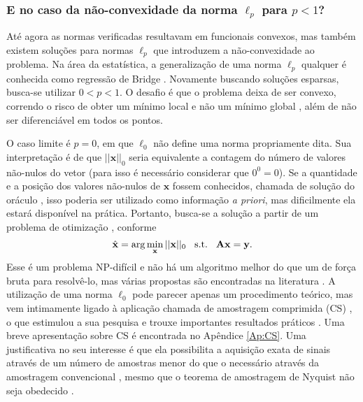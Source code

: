 \subsubsection{E no caso da não-convexidade da norma $\ell_p$ para $p<1$? }

Até agora as normas verificadas resultavam em funcionais convexos, mas também existem soluções para normas $\ell_p$ que introduzem a não-convexidade ao problema. Na área da estatística, a generalização de uma norma $\ell_p$ qualquer é conhecida como regressão de Bridge \cite{Park2011}. Novamente buscando soluções esparsas, busca-se utilizar $0 < p < 1$. O desafio é que o problema deixa de ser convexo, correndo o risco de obter um mínimo local e não um mínimo global \cite{majumdar2019compressed}, além de não ser diferenciável em todos os pontos.

O caso limite é $p=0$, em que $\ell_0$ não define uma norma propriamente dita. Sua interpretação é de que $ \vert \vert \mathbf{x} \vert \vert_{0}$ seria equivalente a contagem do número de valores não-nulos do vetor \cite{Donoho2006} (para isso é necessário considerar que $0^0 = 0$). Se a quantidade e a posição dos valores não-nulos de $\mathbf{x}$ fossem conhecidos, chamada de solução do oráculo \cite[pág. 9]{majumdar2019compressed}, isso poderia ser utilizado como informação \textit{a priori}, mas dificilmente ela estará disponível na prática. Portanto, busca-se a solução a partir de um problema de otimização \cite{baraniuk2007}, conforme 
\begin{equation}
\hat{\mathbf{x}} = \arg\min\limits_{\mathbf{x}}\vert \vert \mathbf{x} \vert \vert_0 \hspace{3mm} \text{s.t.} \hspace{3mm}  \mathbf{A} \mathbf{x} = \mathbf{y}.
\label{eq:norma0}
\end{equation}
Esse é um problema NP-difícil \cite[pág. 10]{majumdar2019compressed} e não há um algoritmo melhor do que um de força bruta para resolvê-lo, mas várias propostas são encontradas na literatura \cite{majumdar2019compressed}. A utilização de uma norma $\ell_0$ pode parecer apenas um procedimento teórico, mas vem intimamente ligado à aplicação chamada de amostragem comprimida (CS) \cite{schulz2009compressive}, o que estimulou a sua pesquisa e trouxe importantes resultados práticos \cite{Donoho2006}. Uma breve apresentação sobre CS é encontrada no Apêndice \ref{Ap:CS}. Uma justificativa no seu interesse é que ela possibilita a aquisição exata de sinais através de um número de amostras menor do que o necessário através da amostragem convencional \cite{majumdar2019compressed}, mesmo que o teorema de amostragem de Nyquist não seja obedecido \cite{baraniuk2007}. 

